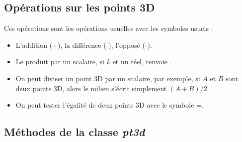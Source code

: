 \subsection{Opérations sur les points 3D}

Ces opérations sont les opérations usuelles avec les symboles usuels :
\begin{itemize}
    \item L'addition (+), la différence (-), l'opposé (-).
    \item Le produit par un scalaire, si $k$ et un réel,  renvoie .
    \item On peut diviser un point 3D par un scalaire, par exemple, si $A$ et $B$ sont deux points 3D, alors le milieu s'écrit simplement $(A+B)/2$.
    \item On peut tester l'égalité de deux points 3D avec le symbole =.
\end{itemize}

\subsection{Méthodes de la classe \emph{pt3d}}

